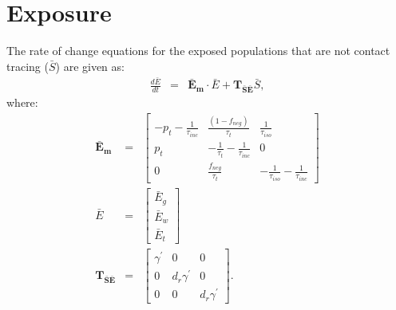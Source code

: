 \documentclass[notitlepage, superscriptaddress]{revtex4-2}
\begin{document}
\section{Exposure}
The rate of change equations for the exposed populations that are not contact tracing ($\bar{S}$) are given as:
\begin{eqnarray}
\frac{d\bar{E}}{dt} &=& \boldsymbol{\bar{E}_{m}} \cdot \bar{E} + \boldsymbol{T_{\bar{S}\bar{E}}}  \bar{S}, 
\end{eqnarray}
where:
\begin{eqnarray}
\boldsymbol{\bar{E}_{m}} &=&
\begin{bmatrix}
 - p_{t} -\frac{1}{\tau_{inc}}  &  \frac{(1-f_{neg})}{\tau_{t}}             & \frac{1}{\tau_{iso}} \\ 
 p_{t}              & -\frac{1}{\tau_{t}} -\frac{1}{\tau_{inc}}  & 0  \\ 
 0                  & \frac{f_{neg}}{\tau_{t}}                  & -\frac{1}{\tau_{iso}} -\frac{1}{\tau_{inc}}
\end{bmatrix} \\ 
%
\bar{E} &=& 
\begin{bmatrix}
\bar{E}_{g} \\ \bar{E}_{w}\\ \bar{E}_{t}
\end{bmatrix} \\
%
\boldsymbol{T_{\bar{S}\bar{E}}} &=& 
    \begin{bmatrix}
\gamma^{'}  & 0                 & 0 \\ 
 0          & d_{r} \gamma^{'}  & 0 \\ 
 0          & 0                 & d_{r} \gamma^{'} 
\end{bmatrix}.
%
\end{eqnarray}
\end{document}
